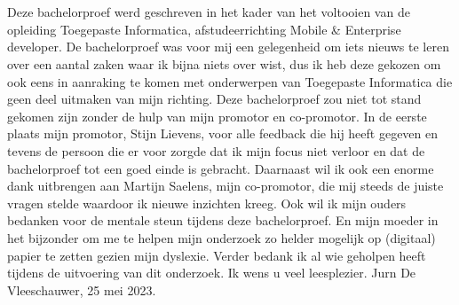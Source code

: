 
\chapter*{}%
\label{ch:voorwoord}

Deze bachelorproef werd geschreven in het kader van het voltooien van de opleiding Toegepaste Informatica, afstudeerrichting Mobile \& Enterprise developer.
De bachelorproef was voor mij een gelegenheid om iets nieuws te leren over een aantal zaken waar ik bijna niets over wist, dus ik heb deze gekozen om ook eens in aanraking te komen met onderwerpen van Toegepaste Informatica die geen deel uitmaken van mijn richting.
Deze bachelorproef zou niet tot stand gekomen zijn zonder de hulp van mijn promotor en co-promotor.
In de eerste plaats mijn promotor, Stijn Lievens, voor alle feedback die hij heeft gegeven en tevens de persoon die er voor zorgde dat ik mijn focus niet verloor en dat de bachelorproef tot een goed einde is gebracht.
Daarnaast wil ik ook een enorme dank uitbrengen aan Martijn Saelens, mijn co-promotor, die mij steeds de juiste vragen stelde waardoor ik nieuwe inzichten kreeg.
Ook wil ik mijn ouders bedanken voor de mentale steun tijdens deze bachelorproef. En mijn moeder in het bijzonder om me te helpen mijn onderzoek zo helder mogelijk op (digitaal) papier te zetten gezien mijn dyslexie.
Verder bedank ik al wie geholpen heeft tijdens de uitvoering van dit onderzoek.
\newline
\newline
Ik wens u veel leesplezier.
\newline
Jurn De Vleeschauwer, 25 mei 2023.
